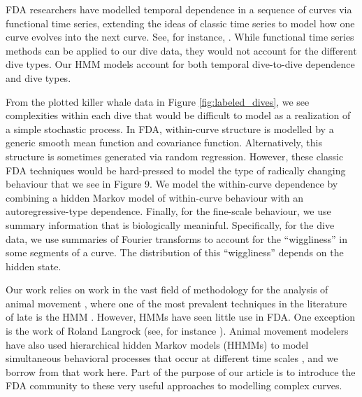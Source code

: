 FDA researchers have modelled temporal dependence in a sequence of curves  via functional time series, extending the ideas of classic time series to model how one curve evolves into the next curve.  See, for instance, \cite{Kokoszka:2018}. 
While  functional time series methods can be applied to our dive data, they would not account for the different dive types.
Our HMM models account for both temporal dive-to-dive dependence and dive types.


 

From the plotted killer whale data in Figure {\ref{fig:labeled_dives}}, we see complexities within each dive that would be difficult to model as a realization of a simple stochastic process. 
In FDA, within-curve structure is modelled by a generic smooth mean function and covariance function.
Alternatively, this structure is sometimes generated via random regression.
However, these classic FDA techniques would be hard-pressed to model the type of radically changing behaviour that we see in Figure 9.
We model the within-curve dependence by combining a hidden Markov model of within-curve behaviour with an autoregressive-type dependence. Finally, for the fine-scale behaviour, we use summary information that is biologically meaninful.   Specifically, for the dive data, we use summaries of Fourier transforms to account for the ``wiggliness'' in some segments of a curve. The distribution of this ``wiggliness'' depends on the hidden state.



Our work relies on work in the vast field of methodology for the analysis of animal movement
\citep{Hooten:2017,Mcclintock:2020}, where
one of the most prevalent techniques in the literature of late is the HMM \citep{Patterson:2017}. 
However, HMMs have seen little use in FDA.  
One exception is the work of Roland Langrock (see, for instance \citealt{Langrock:2018}).
Animal movement modelers have also used  hierarchical hidden Markov models (HHMMs) to model  simultaneous behavioral processes that occur at different time scales \citep{Barajas:2017,Adam:2019}, and we borrow from that work here. 
Part of the purpose of our article is to introduce the FDA community to these very useful approaches to modelling complex curves. 

